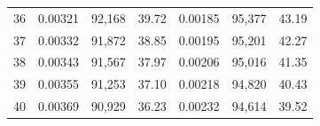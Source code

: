 \begin{tabular}{cccc|ccc}
36   & 0.00321                                                          & 92,168                                                                                            & 39.72                                                                                                                      & 0.00185                                                          & 95,377                                                                                            & 43.19                                                                                                                      \\
37   & 0.00332                                                          & 91,872                                                                                            & 38.85                                                                                                                      & 0.00195                                                          & 95,201                                                                                            & 42.27                                                                                                                      \\
38   & 0.00343                                                          & 91,567                                                                                            & 37.97                                                                                                                      & 0.00206                                                          & 95,016                                                                                            & 41.35                                                                                                                      \\
39   & 0.00355                                                          & 91,253                                                                                            & 37.10                                                                                                                      & 0.00218                                                          & 94,820                                                                                            & 40.43                                                                                                                      \\
40   & 0.00369                                                          & 90,929                                                                                            & 36.23                                                                                                                      & 0.00232                                                          & 94,614                                                                                            & 39.52                                                                                                                      \\

\end{tabular}
